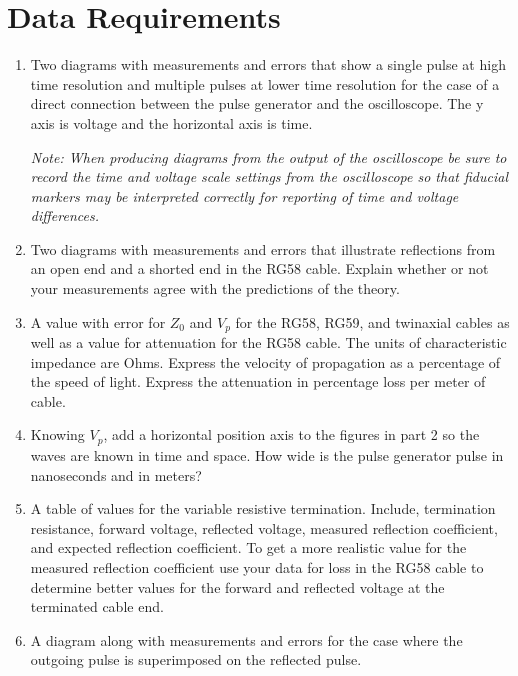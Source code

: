 \section{{\bf Data Requirements}}
\begin{enumerate}[resume]

\item Two diagrams with measurements and errors that show a single pulse at high time resolution and multiple pulses at lower time resolution for the case of a  direct connection between the pulse generator and the oscilloscope. The y axis is voltage and the horizontal axis is time. 

{\it Note: When producing diagrams from the output of the oscilloscope be sure to record the time and voltage scale settings from the oscilloscope so that fiducial markers may be interpreted correctly for reporting of time and voltage differences.}

\item Two diagrams with measurements and errors that illustrate reflections from an open end and a shorted end in the RG58 cable. Explain whether or not  your measurements agree with the predictions of the theory.

\item A value with error for $Z_0$ and $V_p$ for the RG58, RG59, and twinaxial cables as well as a value for attenuation for the RG58 cable. The units of characteristic impedance are Ohms. Express the velocity of propagation as a percentage of the speed of light. Express the attenuation in percentage loss per meter of cable.

\item Knowing $V_p$, add a horizontal position axis to the figures in part 2 so the waves are known in time and space. How wide is the pulse generator pulse in nanoseconds and in meters?

\item A table of values for the variable resistive termination. Include, termination resistance, forward voltage, reflected voltage, measured reflection coefficient, and expected reflection coefficient. To get a more realistic value for the measured reflection coefficient use your data for loss in the RG58 cable to determine better values for the forward and reflected voltage at the terminated cable end.

\item A diagram along with measurements and errors for the case where the outgoing pulse is superimposed on the reflected pulse.


\end{enumerate}
